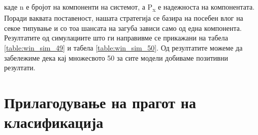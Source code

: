  каде n е бројот на компоненти на системот, а P\textsubscript{x} е надежноста на компонентата. Поради ваквата поставеност, нашата стратегија се базира на посебен влог на секое типување и со тоа шансата на загуба зависи само од една компонента. Резултатите од симулациите што ги направивме се прикажани на табела \ref{table:win_sim_49} и табела \ref{table:win_sim_50}. Од резултатите можеме да забележиме дека кај множесвото 50 за сите модели добиваме позитивни резултати.
 
  \begin{table}[H]
 \centering
\caption{Симулација на добивка за множеството 49}
\label{table:win_sim_49}
\end{table}
 
 \begin{table}[H]
 \centering
\caption{Симулација на добивка за множеството 50}
\label{table:win_sim_50}
\end{table}

\section{Прилагодување на прагот на класификација}

